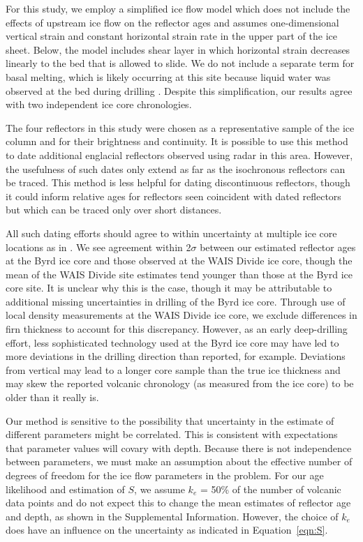 For this study, we employ a simplified ice flow model which does not include the effects of upstream ice flow on the reflector ages and assumes one-dimensional vertical strain and constant horizontal strain rate in the upper part of the ice sheet. Below, the model includes shear layer in which horizontal strain decreases linearly to the bed that is allowed to slide. We do not include a separate term for basal melting, which is likely occurring at this site because liquid water was observed at the bed during drilling \citep{Gow1968}. Despite this simplification, our results agree with two independent ice core chronologies.

The four reflectors in this study were chosen as a representative sample of the ice column and for their brightness and continuity. It is possible to use this method to date additional englacial reflectors observed using radar in this area. However, the usefulness of such dates only extend as far as the isochronous reflectors can be traced. This method is less helpful for dating discontinuous reflectors, though it could inform relative ages for reflectors seen coincident with dated reflectors but which can be traced only over short distances. 

All such dating efforts should agree to within uncertainty at multiple ice core locations as in \citet{cavitte2016}. We see agreement within 2$\sigma$ between our estimated reflector ages at the Byrd ice core and those observed at the WAIS Divide ice core, though the mean of the WAIS Divide site estimates tend younger than those at the Byrd ice core site. It is unclear why this is the case, though it may be attributable to additional missing uncertainties in drilling of the Byrd ice core. Through use of local density measurements at the WAIS Divide ice core, we exclude differences in firn thickness to account for this discrepancy. However, as an early deep-drilling effort, less sophisticated technology used at the Byrd ice core may have led to more deviations in the drilling direction than reported, for example. Deviations from vertical may lead to a longer core sample than the true ice thickness and may skew the reported volcanic chronology (as measured from the ice core) to be older than it really is. 

Our method is sensitive to the possibility that uncertainty in the estimate of different parameters might be correlated. This is consistent with expectations that parameter values will covary with depth. Because there is not independence between parameters, we must make an assumption about the effective number of degrees of freedom for the ice flow parameters in the problem.  For our age likelihood and estimation of $S$, we assume $k_e$ = 50\% of the number of volcanic data points and do not expect this to change the mean estimates of reflector age and depth, as shown in the Supplemental Information. However, the choice of $k_e$ does have an influence on the uncertainty as indicated in Equation~\ref{eqn:S}.\\





